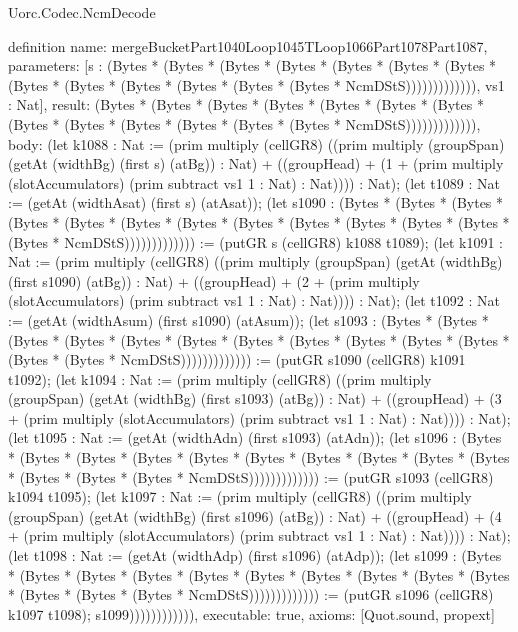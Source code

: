 \begin{lexlean}{Uorc.Codec.NcmDecode}
\begin{semanticmodule}
definition{
  name: mergeBucketPart1040Loop1045TLoop1066Part1078Part1087,
  parameters: [s : (Bytes * (Bytes * (Bytes * (Bytes * (Bytes * (Bytes * (Bytes * (Bytes * (Bytes * (Bytes * (Bytes * (Bytes * (Bytes * NcmDStS))))))))))))), vs1 : Nat],
  result: (Bytes * (Bytes * (Bytes * (Bytes * (Bytes * (Bytes * (Bytes * (Bytes * (Bytes * (Bytes * (Bytes * (Bytes * (Bytes * NcmDStS))))))))))))),
  body: (let k1088 : Nat := (prim multiply (cellGR8) ((prim multiply (groupSpan) (getAt (widthBg) (first s) (atBg)) : Nat) + ((groupHead) + (1 + (prim multiply (slotAccumulators) (prim subtract vs1 1 : Nat) : Nat)))) : Nat); (let t1089 : Nat := (getAt (widthAsat) (first s) (atAsat)); (let s1090 : (Bytes * (Bytes * (Bytes * (Bytes * (Bytes * (Bytes * (Bytes * (Bytes * (Bytes * (Bytes * (Bytes * (Bytes * (Bytes * NcmDStS))))))))))))) := (putGR s (cellGR8) k1088 t1089); (let k1091 : Nat := (prim multiply (cellGR8) ((prim multiply (groupSpan) (getAt (widthBg) (first s1090) (atBg)) : Nat) + ((groupHead) + (2 + (prim multiply (slotAccumulators) (prim subtract vs1 1 : Nat) : Nat)))) : Nat); (let t1092 : Nat := (getAt (widthAsum) (first s1090) (atAsum)); (let s1093 : (Bytes * (Bytes * (Bytes * (Bytes * (Bytes * (Bytes * (Bytes * (Bytes * (Bytes * (Bytes * (Bytes * (Bytes * (Bytes * NcmDStS))))))))))))) := (putGR s1090 (cellGR8) k1091 t1092); (let k1094 : Nat := (prim multiply (cellGR8) ((prim multiply (groupSpan) (getAt (widthBg) (first s1093) (atBg)) : Nat) + ((groupHead) + (3 + (prim multiply (slotAccumulators) (prim subtract vs1 1 : Nat) : Nat)))) : Nat); (let t1095 : Nat := (getAt (widthAdn) (first s1093) (atAdn)); (let s1096 : (Bytes * (Bytes * (Bytes * (Bytes * (Bytes * (Bytes * (Bytes * (Bytes * (Bytes * (Bytes * (Bytes * (Bytes * (Bytes * NcmDStS))))))))))))) := (putGR s1093 (cellGR8) k1094 t1095); (let k1097 : Nat := (prim multiply (cellGR8) ((prim multiply (groupSpan) (getAt (widthBg) (first s1096) (atBg)) : Nat) + ((groupHead) + (4 + (prim multiply (slotAccumulators) (prim subtract vs1 1 : Nat) : Nat)))) : Nat); (let t1098 : Nat := (getAt (widthAdp) (first s1096) (atAdp)); (let s1099 : (Bytes * (Bytes * (Bytes * (Bytes * (Bytes * (Bytes * (Bytes * (Bytes * (Bytes * (Bytes * (Bytes * (Bytes * (Bytes * NcmDStS))))))))))))) := (putGR s1096 (cellGR8) k1097 t1098); s1099)))))))))))),
  executable: true,
  axioms: [Quot.sound, propext]
}


\end{semanticmodule}
\end{lexlean}
